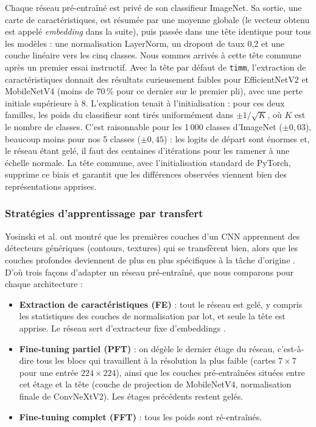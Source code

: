 Chaque réseau pré-entraîné est privé de son classifieur ImageNet. Sa sortie, une carte de caractéristiques, est résumée par une moyenne globale (le vecteur obtenu est appelé \emph{embedding} dans la suite), puis passée dans une tête identique pour tous les modèles : une normalisation LayerNorm, un dropout de taux 0,2 et une couche linéaire vers les cinq classes. Nous sommes arrivés à cette tête commune après un premier essai instructif. Avec la tête par défaut de \texttt{timm}, l'extraction de caractéristiques donnait des résultats curieusement faibles pour EfficientNetV2 et MobileNetV4 (moins de 70\,\% pour ce dernier sur le premier pli), avec une perte initiale supérieure à 8. L'explication tenait à l'initialisation : pour ces deux familles, les poids du classifieur sont tirés uniformément dans $\pm 1/\sqrt{K}$, où $K$ est le nombre de classes. C'est raisonnable pour les 1\,000 classes d'ImageNet ($\pm 0{,}03$), beaucoup moins pour nos 5 classes ($\pm 0{,}45$) : les logits de départ sont énormes et, le réseau étant gelé, il faut des centaines d'itérations pour les ramener à une échelle normale. La tête commune, avec l'initialisation standard de PyTorch, supprime ce biais et garantit que les différences observées viennent bien des représentations apprises.

\subsubsection{Stratégies d'apprentissage par transfert}
\label{sec:strategies}

Yosinski et al. ont montré que les premières couches d'un CNN apprennent des détecteurs génériques (contours, textures) qui se transfèrent bien, alors que les couches profondes deviennent de plus en plus spécifiques à la tâche d'origine \cite{yosinski2014transferable}. D'où trois façons d'adapter un réseau pré-entraîné, que nous comparons pour chaque architecture :
\begin{itemize}
  \item \textbf{Extraction de caractéristiques (FE)} : tout le réseau est gelé, y compris les statistiques des couches de normalisation par lot, et seule la tête est apprise. Le réseau sert d'extracteur fixe d'embeddings \cite{razavian2014cnn}.
  \item \textbf{Fine-tuning partiel (PFT)} : on dégèle le dernier étage du réseau, c'est-à-dire tous les blocs qui travaillent à la résolution la plus faible (cartes $7\times7$ pour une entrée $224\times224$), ainsi que les couches pré-entraînées situées entre cet étage et la tête (couche de projection de MobileNetV4, normalisation finale de ConvNeXtV2). Les étages précédents restent gelés.
  \item \textbf{Fine-tuning complet (FFT)} : tous les poids sont ré-entraînés.
\end{itemize}

